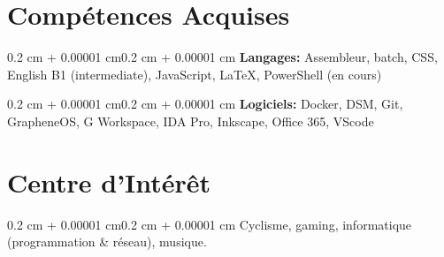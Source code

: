 \documentclass[11pt, a4paper]{article}
\newenvironment{onecolentry}{
    \begin{adjustwidth}
        {0.2 cm + 0.00001 cm}{0.2 cm + 0.00001 cm}}{
    \end{adjustwidth}
}
\begin{document}
    
    \section{Compétences Acquises}
        
        \begin{onecolentry}
            \textbf{Langages:} Assembleur, batch, CSS, English B1 (intermediate), JavaScript, {\LaTeX}, PowerShell (en cours)
        \end{onecolentry}

        \vspace{0.2 cm}

        \begin{onecolentry}
            \textbf{Logiciels:} Docker, DSM, Git, GrapheneOS, G Workspace, IDA Pro, Inkscape, Office 365, VScode
        \end{onecolentry}


    \section{Centre d'Intérêt}
        \begin{onecolentry}
            Cyclisme, gaming, informatique (programmation \& réseau), musique.
        \end{onecolentry}
    
\end{document}
